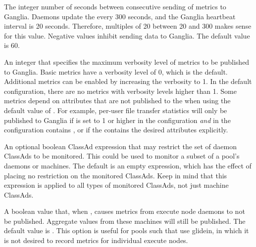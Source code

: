 \begin{description}

\label{param:GangliadInterval}
\item[\Macro{GANGLIAD\_INTERVAL}]
  The integer number of seconds between consecutive sending 
  of metrics to Ganglia.
  Daemons update the  every 300 seconds,
  and the Ganglia heartbeat interval is 20 seconds. 
  Therefore, multiples of 20 between 20 and 300 makes sense for this value.
  Negative values inhibit sending data to Ganglia.
  The default value is 60.

\label{param:GangliadVerbosity}
\item[\Macro{GANGLIAD\_VERBOSITY}] An integer that specifies the
  maximum verbosity level of metrics to be published to Ganglia.
  Basic metrics have a verbosity level of 0, which is the default.
  Additional metrics can be enabled by increasing the verbosity to 1.
  In the default configuration, there are no metrics with verbosity
  levels higher than 1.  Some metrics depend on attributes that are
  not published to the  when using the default value of
  .  For example, per-user file
  transfer statistics will only be published to Ganglia if
   is set to 1 or higher in the
   configuration \emph{and}
   in the  configuration
  contains , or if the 
  contains the desired attributes explicitly.

\label{param:GangliadRequirements}
\item[\Macro{GANGLIAD\_REQUIREMENTS}] An optional boolean ClassAd expression
  that may restrict the set of daemon ClassAds to be monitored.  This could be
  used to monitor a subset of a pool's daemons or machines.
  The default is an empty expression, 
  which has the effect of placing no restriction on the monitored ClassAds. 
  Keep in mind that this expression is applied to
  all types of monitored ClassAds, not just machine ClassAds.

\label{param:GangliadPerExecuteNodeMetrics}
\item[\Macro{GANGLIAD\_PER\_EXECUTE\_NODE\_METRICS}] 
  A boolean value that, when ,
  causes metrics from execute node daemons to not be published.
  Aggregate values from these machines will still be published.  
  The default value is .  
  This option is useful for pools such that use glidein, 
  in which it is not desired to record metrics for individual execute nodes.


\end{description}
